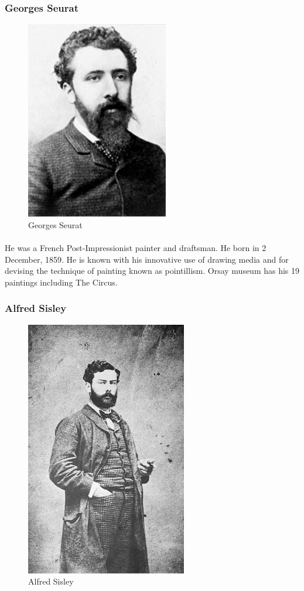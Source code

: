 \documentclass[
10pt, %
a4paper, %
oneside, %
headinclude,footinclude, %
BCOR5mm, %
]{scrartcl}
\theoremstyle{definition} %
\theoremstyle{plain} %
\theoremstyle{remark} %
\begin{document}
\subsubsection{Georges Seurat}
\begin{figure}[tbH]
\centering
\includegraphics[width=.30\columnwidth]{Images/17.jpg}
\caption[Georges Seurat]{Georges Seurat} %
\label{fig:seurat}
\end{figure}

\paragraph{}
He was a French Post-Impressionist painter and draftsman. He born in 2 December, 1859. He is known with his innovative use of drawing media and for devising the technique of painting known as pointillism. Orsay museum has his 19 paintings including The Circus.


\subsubsection{Alfred Sisley}
\begin{figure}[tbH]
\centering
\includegraphics[width=.30\columnwidth]{Images/15.png}
\caption[Alfred Sisley]{Alfred Sisley} %
\label{fig:sisley}
\end{figure}
\end{document}
